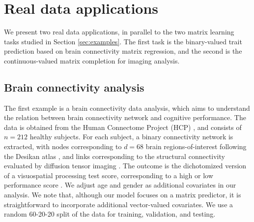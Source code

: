 \documentclass[aos]{imsart}
\theoremstyle{definition}
\begin{document}
\section{Real data applications}
\label{sec:realdata}

We present two real data applications, in parallel to the two matrix learning tasks studied in Section \ref{sec:examples}. The first task is the binary-valued trait prediction based on brain connectivity matrix regression, and the second is the continuous-valued matrix completion for imaging analysis. 



\subsection{Brain connectivity analysis}
\label{sec:brain}

The first example is a brain connectivity data analysis, which aims to understand the relation between brain connectivity network and cognitive performance. The data is obtained from the Human Connectome Project (HCP) \cite{van2013wu}, and consists of $n=212$ healthy subjects. For each subject, a binary connectivity network is extracted, with nodes corresponding to $d=68$ brain regions-of-interest following the Desikan atlas \cite{desikan2006automated}, and links corresponding to the structural connectivity evaluated by diffusion tensor imaging \cite{zhang2018mapping}. The outcome is the dichotomized version of a visuospatial processing test score, corresponding to a high or low performance score \cite{wang2019common}. We adjust age and gender as additional covariates in our analysis. We note that, although our model focuses on a matrix predictor, it is straightforward to incorporate additional vector-valued covariates. We use a random 60-20-20 split of the data for training, validation, and testing. 
\end{document}
